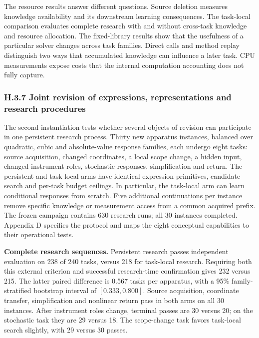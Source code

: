 \documentclass[twoside,11pt]{article}
\begin{document}
The resource results answer different questions. Source deletion measures knowledge availability and its downstream learning consequences. The task-local comparison evaluates complete research with and without cross-task knowledge and resource allocation. The fixed-library results show that the usefulness of a particular solver changes across task families. Direct calls and method replay distinguish two ways that accumulated knowledge can influence a later task. CPU measurements expose costs that the internal computation accounting does not fully capture.


\subsubsection*{H.3.7 Joint revision of expressions, representations and research procedures}

The second instantiation tests whether several objects of revision can participate
in one persistent research process. Thirty new apparatus instances, balanced over
quadratic, cubic and absolute-value response families, each undergo eight tasks:
source acquisition, changed coordinates, a local scope change, a hidden input,
changed instrument roles, stochastic responses, simplification and return. The
persistent and task-local arms have identical expression primitives, candidate
search and per-task budget ceilings. In particular, the task-local arm can learn
conditional responses from scratch. Five additional continuations per instance
remove specific knowledge or measurement access from a common acquired prefix.
The frozen campaign contains 630 research runs; all 30 instances completed.
Appendix D specifies the protocol and maps the eight conceptual capabilities to
their operational tests.


\textbf{Complete research sequences.} Persistent research passes independent evaluation
on 238 of 240 tasks, versus 218 for task-local research. Requiring both this
external criterion and successful research-time confirmation gives 232 versus
215. The latter paired difference is 0.567 tasks per apparatus, with a 95\%
family-stratified bootstrap interval of \([0.333,0.800]\). Source acquisition,
coordinate transfer, simplification and nonlinear return pass in both arms on
all 30 instances. After instrument roles change, terminal passes are 30 versus
20; on the stochastic task they are 29 versus 18. The scope-change task favors
task-local search slightly, with 29 versus 30 passes.
\end{document}
